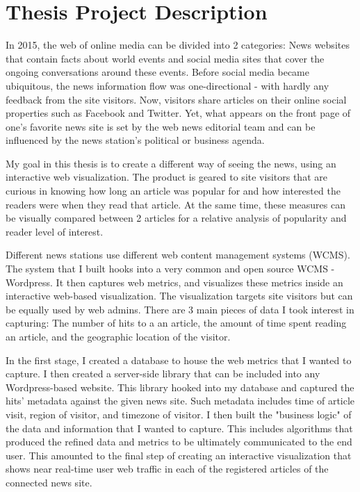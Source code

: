 \documentclass[12pt]{article}
\begin{document}
\tableofcontents

\vfill

\section{Thesis Project Description}
In 2015, the web of online media can be divided into 2 categories: News websites that contain facts about world events and social media sites that cover the ongoing conversations around these events. Before social media became ubiquitous, the news information flow was one-directional - with hardly any feedback from the site visitors. Now, visitors share articles on their online social properties such as Facebook and Twitter. Yet, what appears on the front page of one's favorite news site is set by the web news editorial team and can be influenced by the news station's political or business agenda. 

My goal in this thesis is to create a different way of seeing the news, using an interactive web visualization. The product is geared to site visitors that are curious in knowing how long an article was popular for and how interested the readers were when they read that article. At the same time, these measures can be visually compared between 2 articles for a relative analysis of popularity and reader level of interest. 

Different news stations use different web content management systems (WCMS). The system that I built hooks into a very common and open source WCMS - Wordpress. It then captures web metrics, and visualizes these metrics inside an interactive web-based visualization. The visualization targets site visitors but can be equally used by web admins. There are 3 main pieces of data I took interest in capturing: The number of hits to a an article, the amount of time spent reading an article, and the geographic location of the visitor. 

In the first stage, I created a database to house the web metrics that I wanted to capture. I then created a server-side library that can be included into any Wordpress-based website. This library hooked into my database and captured the hits' metadata against the given news site. Such metadata includes time of article visit, region of visitor, and timezone of visitor.  
I then built the "business logic" of the data and information that I wanted to capture. This includes algorithms that produced the refined data and metrics to be ultimately communicated to the end user.
This amounted to the final step of creating an interactive visualization that shows near real-time user web traffic in each of the registered articles of the connected news site.
\end{document}
